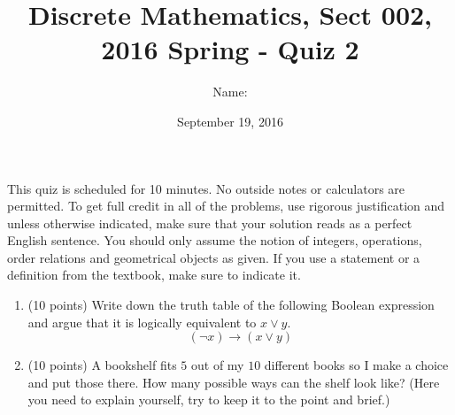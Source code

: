 \documentclass[11pt]{preprint}
\title{Discrete Mathematics, Sect 002, 2016 Spring - Quiz 2}
\author{Name:}
\institute{Courant Institute of Mathematical Sciences, NYU}
\date{September 19, 2016}
\begin{document}
\maketitle

This quiz is scheduled for 10 minutes. No outside notes or calculators are permitted. To get full credit  in all of the problems, use rigorous justification and unless otherwise indicated, make sure that your solution reads as a perfect English sentence. You should only assume the notion of integers, operations, order relations and geometrical objects as given. If you use a statement or a definition from the textbook, make sure to indicate it.
\vspace{0.2cm}

\begin{enumerate}
\item (10 points) Write down the truth table of the following Boolean expression and argue that it is logically equivalent to $x\vee y$.
\[
(\neg x)\to(x\vee y)
\]
\vspace{3.15cm}
\item (10 points) A bookshelf fits $5$ out of my $10$ different books so I make a choice and put those there. How many possible ways can the shelf look like? (Here you need to explain yourself, try to keep it to the point and brief.)
\vspace{3cm}

\end{enumerate}
\end{document}

